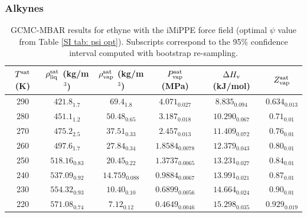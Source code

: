 \documentclass[journal=jctc,manuscript=article]{achemso}
\begin{document}
\newpage
\clearpage

\subsubsection{Alkynes}


\begin{table}[htb!]
	\caption{GCMC-MBAR results for ethyne with the iMiPPE force field (optimal $\psi$ value from Table \ref{SI tab: psi opt}). Subscripts correspond to the 95\% confidence interval computed with bootstrap re-sampling.}
	\begin{center}
		\begin{tabular}{|c|c|c|c|c|c|}
			\hline
			$T^{\rm sat}$ (K) & $\rho_{\rm liq}^{\rm sat}$ (kg/m$^3$) & $\rho_{\rm vap}^{\rm sat}$ (kg/m$^3$) & $P_{\rm vap}^{\rm sat}$ (MPa) & $\Delta H_{\rm v}$ (kJ/mol) & $Z_{\rm vap}^{\rm sat}$ \\ \hline
			290 & $421.8_{1.7}$ & $69.4_{1.8}$ & $4.071_{0.027}$ & $8.835_{0.094}$ & $0.634_{0.013}$ \\
			280 & $451.1_{1.2}$ & $50.48_{0.65}$ & $3.187_{0.018}$ & $10.290_{0.067}$ & $0.71_{0.01}$ \\
			270 & $475.2_{2.5}$ & $37.51_{0.33}$ & $2.457_{0.013}$ & $11.409_{0.072}$ & $0.76_{0.01}$ \\
			260 & $497.6_{1.7}$ & $27.84_{0.34}$ & $1.8584_{0.0078}$ & $12.379_{0.043}$ & $0.80_{0.01}$ \\
			250 & $518.16_{0.83}$ & $20.45_{0.22}$ & $1.3737_{0.0065}$ & $13.231_{0.027}$ & $0.84_{0.01}$ \\
			240 & $537.09_{0.92}$ & $14.759_{0.088}$ & $0.9884_{0.0067}$ & $13.991_{0.021}$ & $0.87_{0.01}$ \\
			230 & $554.32_{0.93}$ & $10.40_{0.10}$ & $0.6899_{0.0056}$ & $14.664_{0.024}$ & $0.90_{0.01}$ \\
			220 & $571.08_{0.74}$ & $7.12_{0.12}$ & $0.4649_{0.0046}$ & $15.298_{0.035}$ & $0.929_{0.019}$ \\
			\hline
		\end{tabular}
	\end{center}
\end{table}
\end{document}
